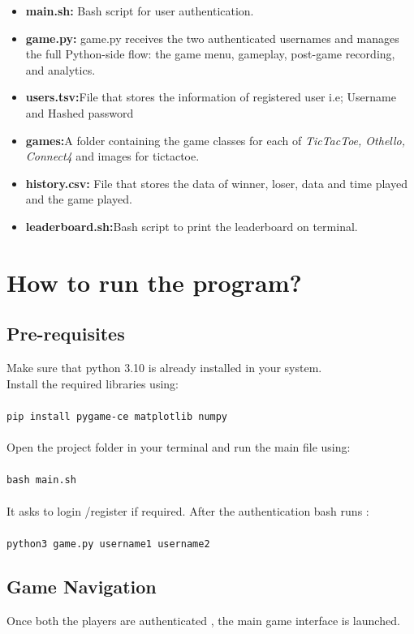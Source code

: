 \documentclass{article}
\begin{document}
\begin{itemize}
    \item \textbf{main.sh:} Bash script for user authentication.
    \item \textbf{game.py:} game.py receives the two authenticated usernames and manages the full Python-side flow: the game menu, gameplay, post-game recording, and analytics.
    \item \textbf{users.tsv:}File that stores the information of registered user i.e; Username and Hashed password
    \item \textbf{games:}A folder containing the game classes for each of \textit{TicTacToe, Othello, Connect4} and images for tictactoe.
    \item \textbf{history.csv:} File that stores the data of winner, loser, data and time played and the game played.
    \item \textbf{leaderboard.sh:}Bash script to print the leaderboard on terminal.
    
\end{itemize}

\section{How to run the program?}
\subsection{Pre-requisites}
Make sure that python 3.10 is already installed in your system\cite{python}.\\
Install the required libraries  using:\\ \\
\texttt{pip install pygame-ce matplotlib numpy}\\
\\
Open the project folder in your terminal and 
run the main file using:\\ \\
\texttt{bash main.sh}\\ \\
It asks to login /register if required.
After the authentication bash runs :\\ \\
\texttt{python3 game.py username1 username2}

\subsection{Game Navigation}
Once both the players are authenticated , the main game interface is launched.\\
\end{document}
